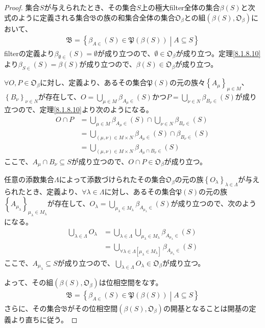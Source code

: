\documentclass[dvipdfmx]{jsarticle}
\begin{document}
\begin{proof}
集合$S$が与えられたとき、その集合$S$上の極大filter全体の集合$\beta(S)$と次式のように定義される集合$\mathfrak{B}$の族の和集合全体の集合$\mathfrak{O}_{\beta}$との組$\left( \beta(S),\mathfrak{O}_{\beta} \right)$において、
\begin{align*}
\mathfrak{B} = \left\{ \beta_{A \in}(S)\in \mathfrak{P}\left( \beta(S) \right) \middle| A \subseteq S \right\}
\end{align*}
filterの定義より$\beta_{\emptyset \in}(S) = \emptyset$が成り立つので、$\emptyset \in \mathfrak{O}_{\beta}$が成り立つ。定理\ref{8.1.8.10}より$\beta_{S \in}(S) = \beta(S)$が成り立つので、$\beta(S) \in \mathfrak{O}_{\beta}$が成り立つ。\par
$\forall O,P \in \mathfrak{O}_{\beta}$に対し、定義より、あるその集合$\mathfrak{P}(S)$の元の族々$\left\{ A_{\mu} \right\}_{\mu \in M }$、$\left\{ B_{\nu} \right\}_{\nu \in N }$が存在して、$O = \bigcup_{\mu \in M} {\beta_{A_{\mu} \in}(S)}$かつ$P = \bigcup_{\nu \in N} {\beta_{B_{\nu} \in}(S)}$が成り立つので、定理\ref{8.1.8.10}より次のようになる。
\begin{align*}
O \cap P &= \bigcup_{\mu \in M} {\beta_{A_{\mu} \in}(S)} \cap \bigcup_{\nu \in N} {\beta_{B_{\nu} \in}(S)}\\
&= \bigcup_{(\mu,\nu) \in M \times N} {\beta_{A_{\mu} \in}(S) \cap \beta_{B_{\nu} \in}(S)}\\
&= \bigcup_{(\mu,\nu) \in M \times N} {\beta_{A_{\mu} \cap B_{\nu} \in}(S)}
\end{align*}
ここで、$A_{\mu} \cap B_{\nu} \subseteq S$が成り立つので、$O \cap P \in \mathfrak{O}_{\beta}$が成り立つ。\par
任意の添数集合$\varLambda$によって添数づけられたその集合$\mathfrak{O}_{\beta}$の元の族$\left\{ O_{\lambda} \right\}_{\lambda \in \varLambda}$が与えられたとき、定義より、$\forall\lambda \in \varLambda$に対し、あるその集合$\mathfrak{P}(S)$の元の族$\left\{ A_{\mu_{\lambda}} \right\}_{\mu_{\lambda} \in M_{\lambda} }$が存在して、$O_{\lambda} = \bigcup_{\mu_{\lambda} \in M_{\lambda}} {\beta_{A_{\mu_{\lambda}} \in}(S)}$が成り立つので、次のようになる。
\begin{align*}
\bigcup_{\lambda \in \varLambda} O_{\lambda} &= \bigcup_{\lambda \in \varLambda} {\bigcup_{\mu_{\lambda} \in M_{\lambda}} {\beta_{A_{\mu_{\lambda}} \in}(S)}}\\
&= \bigcup_{\forall\lambda \in \varLambda\left[ \mu_{\lambda} \in M_{\lambda} \right]} {\beta_{A_{\mu_{\lambda}} \in}(S)}
\end{align*}
ここで、$A_{\mu_{\lambda}} \subseteq S$が成り立つので、$\bigcup_{\lambda \in \varLambda} O_{\lambda} \in \mathfrak{O}_{\beta}$が成り立つ。\par
よって、その組$\left( \beta(S),\mathfrak{O}_{\beta} \right)$は位相空間をなす。
\begin{align*}
\mathfrak{B} = \left\{ \beta_{A \in}(S)\in \mathfrak{P}\left( \beta(S) \right) \middle| A \subseteq S \right\}
\end{align*}
さらに、その集合$\mathfrak{B}$がその位相空間$\left( \beta(S),\mathfrak{O}_{\beta} \right)$の開基となることは開基の定義より直ちに従う。
\end{proof}
\end{document}
